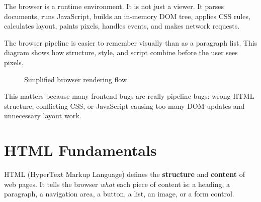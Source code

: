 \documentclass[12pt, a4paper, oneside]{book}
\begin{document}
\begin{intuitionbox}
The browser is a runtime environment. It is not just a viewer. It parses documents, runs JavaScript, builds an in-memory DOM tree, applies CSS rules, calculates layout, paints pixels, handles events, and makes network requests.
\end{intuitionbox}

The browser pipeline is easier to remember visually than as a paragraph list. This diagram shows how structure, style, and script combine before the user sees pixels.

\begin{figure}[H]
\centering
{}
\caption{Simplified browser rendering flow}
\label{fig:browser-rendering-flow}
\end{figure}

This matters because many frontend bugs are really pipeline bugs: wrong HTML structure, conflicting CSS, or JavaScript causing too many DOM updates and unnecessary layout work.

\section{HTML Fundamentals}

HTML (HyperText Markup Language) defines the \textbf{structure} and \textbf{content} of web pages. It tells the browser \emph{what} each piece of content is: a heading, a paragraph, a navigation area, a button, a list, an image, or a form control.
\end{document}
